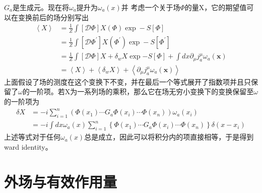 \documentclass[10pt,openany]{book}
\theoremstyle{thmstyle} %
\theoremstyle{defstyle} %
\theoremstyle{prostyle} %
\begin{document}
$ G_a $是生成元。现在将$ \omega_a $提升为$ \omega_a(x) $并 考虑一个关于场$ \Phi $的量X，它的期望值可以在变换前后的场分别写出
\begin{equation}
    \begin{aligned}
    \left\langle X \right\rangle & =\frac{1}{Z} \int[\mathcal{D} \Phi] X(\Phi) \exp -S[\Phi] \\
    & =\frac{1}{Z} \int\left[\mathcal{D} \Phi^{\prime}\right] X(\Phi^{\prime}) \exp -S\left[\Phi^{\prime}\right] \\
    & =\frac{1}{Z} \int[\mathcal{D} \Phi] X+\delta_w X \exp {-S[\Phi]+\int d x \partial_\mu j_a^\mu \omega_a(\boldsymbol{x})} \\
    & =\left\langle X \right\rangle + \left\langle \delta_w X \right\rangle +\left\langle \partial_\mu j_a^\mu \omega_a(\boldsymbol{x}) \right\rangle
    \end{aligned}
\end{equation}
上面假设了场的测度在这个变换下不变，并在最后一个等式展开了指数项并且只保留了$ \omega $的一阶项。若X为一系列场的乘积，那么它在场无穷小变换下的变换保留至$ \omega $的一阶项为
\begin{equation}
  \begin{aligned}
    \delta X & =-i \sum_{i=1}^n\left(\Phi\left(x_1\right) \cdots G_a \Phi\left(x_i\right) \cdots \Phi\left(x_n\right)\right) \omega_a\left(x_i\right) \\
    & =-i \int d x \omega_a(x) \sum_{i=1}^n\left\{\Phi\left(x_1\right) \cdots G_a \Phi\left(x_i\right) \cdots \Phi\left(x_n\right)\right\} \delta\left(x-x_i\right)
    \end{aligned}
\end{equation}
上述等式对于任何$ \omega_a(x) $总是成立，因此可以将积分内的项直接相等，于是得到ward identity。
\begin{center}

\end{center}

\section{外场与有效作用量}
\end{document}
